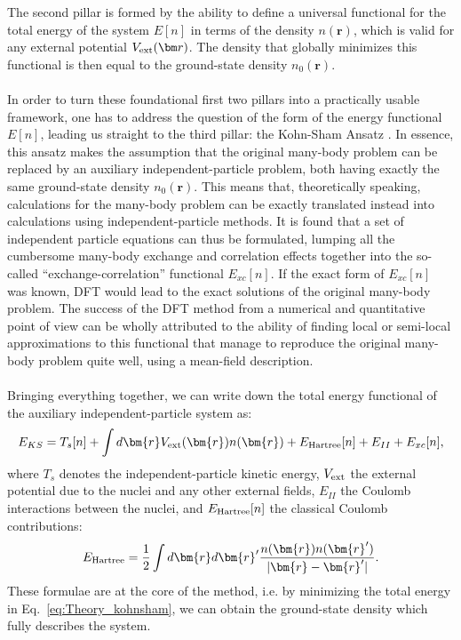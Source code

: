 The second pillar is formed by the ability to define a universal functional for the total energy of the system $E[n]$ in terms of the density $n(\bm{r})$, which is valid for any external potential $V_{\rm ext}(\bm r)$.
The density that globally minimizes this functional is then equal to the ground-state density $n_0(\bm{r})$.
\\\\
In order to turn these foundational first two pillars into a practically usable framework, one has to address the question of the form of the energy functional $E[n]$, leading us straight to the third pillar: the Kohn-Sham Ansatz \cite{Kohn1965}.
In essence, this ansatz makes the assumption that the original many-body problem can be replaced by an auxiliary independent-particle problem, both having exactly the same ground-state density $n_0(\bm{r})$.
This means that, theoretically speaking, calculations for the many-body problem can be exactly translated instead into calculations using independent-particle methods.
It is found that a set of independent particle equations can thus be formulated, lumping all the cumbersome many-body exchange and correlation effects together into the so-called ``exchange-correlation'' functional $E_{xc}[n]$.
If the exact form of $E_{xc}[n]$ was known, DFT would lead to the exact solutions of the original many-body problem.
The success of the DFT method from a numerical and quantitative point of view can be wholly attributed to the ability of finding local or semi-local approximations to this functional that manage to reproduce the original many-body problem quite well, using a mean-field description.
\\\\
Bringing everything together, we can write down the total energy functional of the auxiliary independent-particle system as:
\begin{equation}
	\label{eq:Theory_kohnsham}
	E_{KS} = T_s[n] + \int d\bm{r} V_{\rm ext}(\bm{r}) n(\bm{r}) + E_{\rm Hartree}[n] + E_{II} + E_{xc}[n],
\end{equation}
where $T_s$ denotes the independent-particle kinetic energy, $V_{\rm ext}$ the external potential due to the nuclei and any other external fields, $E_{II}$ the Coulomb interactions between the nuclei, and $E_{\rm Hartree}[n]$ the classical Coulomb contributions:
\begin{equation}
	E_{\rm Hartree} = \frac{1}{2}\int d\bm{r}d\bm{r}' \frac{n(\bm{r})n(\bm{r}')}{|\bm{r} - \bm{r}'|}.
\end{equation}
These formulae are at the core of the method, i.e. by minimizing the total energy in Eq.~\eqref{eq:Theory_kohnsham}, we can obtain the ground-state density which fully describes the system.
